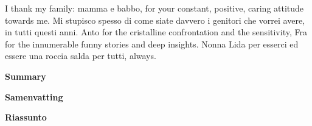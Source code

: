 I thank my family: mamma e babbo, for your constant, positive, caring attitude towards me. Mi stupisco spesso di come siate davvero i genitori che vorrei avere, in tutti questi anni.
Anto for the cristalline confrontation and the sensitivity, Fra for the innumerable funny stories and deep insights. Nonna Lida per esserci ed essere una roccia salda per tutti, always.

\clearpage
\thispagestyle{empty}
\null%
\label{thesis:Summary}
\begin{center}
  {\Large \textbf{Summary}}\\
\end{center}

\clearpage
\thispagestyle{empty}
\null%
\begin{center}
  {\Large \textbf{Samenvatting}}\\
\end{center}

\clearpage
\thispagestyle{empty}
\null%
\begin{center}
  {\Large \textbf{Riassunto}}\\
\end{center}